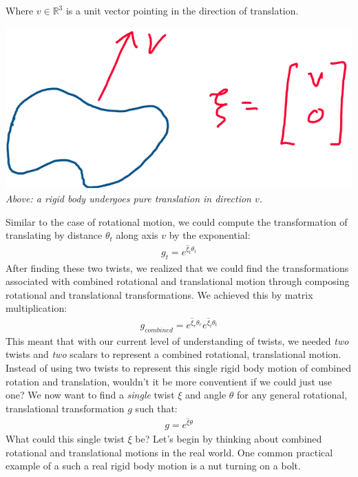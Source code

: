 \documentclass[oneside]{book}
\begin{document}
Where $v\in \mathbb{R}^3$ is a unit vector pointing in the direction of translation.
\begin{center}
    \includegraphics[scale=0.3]{images/translationTwist.png}\\
    \textit{Above: a rigid body undergoes pure translation in direction $v$.}
\end{center}
Similar to the case of rotational motion, we could compute the transformation of translating by distance $\theta_t$ along axis $v$ by the exponential:
\begin{align}
    g_{t} = e^{\hat\xi_{t}\theta_t}
\end{align}
After finding these two twists, we realized that we could find the transformations associated with combined rotational and translational motion through composing rotational and translational transformations. We achieved this by matrix multiplication:
\begin{align}
    g_{combined} = e^{\hat\xi_r\theta_r}e^{\hat\xi_t\theta_t}
\end{align}
This meant that with our current level of understanding of twists, we needed \textit{two} twists and \textit{two} scalars to represent a combined rotational, translational motion.\\
Instead of using two twists to represent this single rigid body motion of combined rotation and translation, wouldn't it be more conventient if we could just use one? We now want to find a \textit{single} twist $\xi$ and angle $\theta$ for any general rotational, translational transformation $g$ such that:
\begin{align}
    g = e^{\hat\xi\theta}
\end{align}
What could this single twist $\xi$ be? Let's begin by thinking about combined rotational and translational motions in the real world. One common practical example of a such a real rigid body motion is a nut turning on a bolt.
\end{document}
